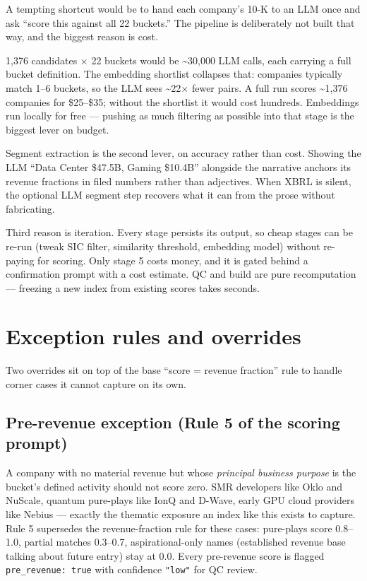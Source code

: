 \documentclass[11pt,a4paper,oneside]{article}
\begin{document}
A tempting shortcut would be to hand each company's 10-K to an LLM once and ask ``score this against all 22 buckets.'' The pipeline is deliberately not built that way, and the biggest reason is cost.

1,376 candidates \(\times\) 22 buckets would be \textasciitilde 30,000 LLM calls, each carrying a full bucket definition. The embedding shortlist collapses that: companies typically match 1--6 buckets, so the LLM sees \textasciitilde 22\(\times\) fewer pairs. A full run scores \textasciitilde 1,376 companies for \$25--\$35; without the shortlist it would cost hundreds. Embeddings run locally for free --- pushing as much filtering as possible into that stage is the biggest lever on budget.

Segment extraction is the second lever, on accuracy rather than cost. Showing the LLM ``Data Center \$47.5B, Gaming \$10.4B'' alongside the narrative anchors its revenue fractions in filed numbers rather than adjectives. When XBRL is silent, the optional LLM segment step recovers what it can from the prose without fabricating.

Third reason is iteration. Every stage persists its output, so cheap stages can be re-run (tweak SIC filter, similarity threshold, embedding model) without re-paying for scoring. Only stage 5 costs money, and it is gated behind a confirmation prompt with a cost estimate. QC and build are pure recomputation --- freezing a new index from existing scores takes seconds.

\section{Exception rules and overrides}

Two overrides sit on top of the base ``score = revenue fraction'' rule to handle corner cases it cannot capture on its own.

\subsection*{Pre-revenue exception (Rule 5 of the scoring prompt)}

A company with no material revenue but whose \emph{principal business purpose} is the bucket's defined activity should not score zero. SMR developers like Oklo and NuScale, quantum pure-plays like IonQ and D-Wave, early GPU cloud providers like Nebius --- exactly the thematic exposure an index like this exists to capture. Rule 5 supersedes the revenue-fraction rule for these cases: pure-plays score 0.8--1.0, partial matches 0.3--0.7, aspirational-only names (established revenue base talking about future entry) stay at 0.0. Every pre-revenue score is flagged \texttt{pre\_revenue: true} with confidence \texttt{"low"} for QC review.
\end{document}
